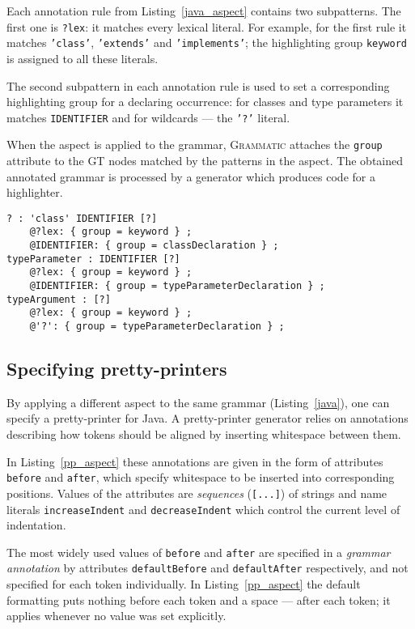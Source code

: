 \documentclass{IOS-Book-Article}     %
\newcommand{\lstref}[1]{Listing~\ref{#1}}
\newcommand{\tool}[1]{\textsc{#1}}
\newcommand{\Grammatic}[0]{\tool{Grammatic}}
\begin{document}
\lstset{language=Grammatic}
Each annotation rule from \lstref{java_aspect} contains two subpatterns. The first one is \texttt{?lex}: it matches every lexical literal. For example, for the first rule it matches \texttt{'class'}, \texttt{'extends'} and \texttt{'implements'}; the highlighting group \texttt{keyword} is assigned to all these literals.

The second subpattern in each annotation rule is used to set a corresponding highlighting group for a declaring occurrence: for classes and type parameters it matches \texttt{IDENTIFIER} and for wildcards --- the \texttt{'?'} literal.

When the aspect is applied to the grammar, \Grammatic{} attaches the \texttt{group} attribute to the GT nodes matched by the patterns in the aspect. The obtained annotated grammar is processed by a generator which produces code for a highlighter.

\begin{lstlisting}[language=Grammatic,caption=Highlighting aspect for class declarations in Java,float,label=java_aspect]
? : 'class' IDENTIFIER [?]
	@?lex: { group = keyword } ;
	@IDENTIFIER: { group = classDeclaration } ;
typeParameter : IDENTIFIER [?]
	@?lex: { group = keyword } ;
	@IDENTIFIER: { group = typeParameterDeclaration } ;
typeArgument : [?]
	@?lex: { group = keyword } ;
	@'?': { group = typeParameterDeclaration } ;
\end{lstlisting}

\subsection{Specifying pretty-printers}

By applying a different aspect to the same grammar (\lstref{java}), one can specify a pretty-printer for Java. A pretty-printer generator relies on annotations describing how tokens should be aligned by inserting whitespace between them. 

In \lstref{pp_aspect} these annotations are given in the form of attributes \texttt{before} and \texttt{after}, which specify whitespace to be inserted into corresponding positions. Values of the attributes are \emph{sequences} (\texttt{[...]}) of strings and name literals \texttt{increaseIndent} and \texttt{decreaseIndent} which control the current level of indentation. 

The most widely used values of \texttt{before} and \texttt{after} are specified in a \emph{grammar annotation} by attributes \texttt{defaultBefore} and \texttt{defaultAfter} respectively, and not specified for each token individually. In \lstref{pp_aspect} the default formatting puts nothing before each token and a space --- after each token; it applies whenever no value was set explicitly.
\end{document}
